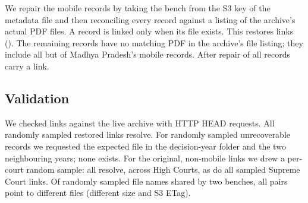 \documentclass[conference]{IEEEtran}
\begin{document}
We repair the mobile records by taking the bench from the S3 key of the metadata file and then reconciling every record against a listing of the archive's actual PDF files. A record is linked only when its file exists. This restores \MobileLinked{} links (\MobileLinkedPct). The remaining \MobileUnrecov{} records have no matching PDF in the archive's file listing; they include all but \MPLinked{} of Madhya Pradesh's \MPMobile{} mobile records. After repair \LinkedPct{} of all records carry a link.

\begin{table}[t]
\caption{High Court records from the archive's mobile path, and the links restored by reconciliation against the archive's file listing.}
\label{tab:mobile}
\centering

\end{table}

\subsection{Validation}
We checked links against the live archive with HTTP HEAD requests. All \RecoveredChecked{} randomly sampled restored links resolve. For \UnresolvedChecked{} randomly sampled unrecoverable records we requested the expected file in the decision-year folder and the two neighbouring years; none exists. For the original, non-mobile links we drew a per-court random sample: all \NonmobileChecked{} resolve, across \NonmobileCourts{} High Courts, as do all \SCLinksChecked{} sampled Supreme Court links. Of \PairsChecked{} randomly sampled file names shared by two benches, all \PairsDiffer{} pairs point to different files (different size and S3 ETag).
\end{document}
